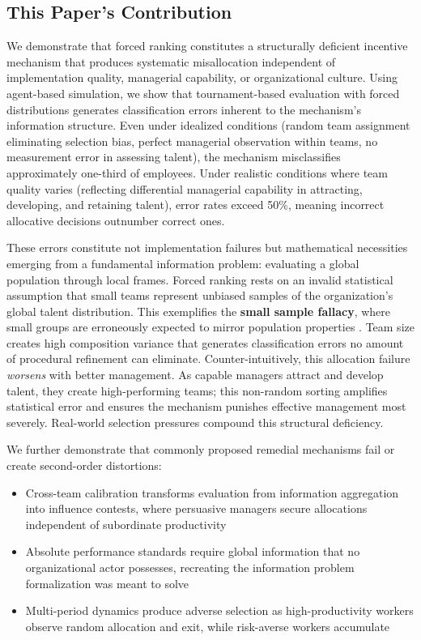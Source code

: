 \documentclass[12pt]{article}
\begin{document}
\subsection{This Paper's Contribution}

We demonstrate that forced ranking constitutes a structurally deficient incentive mechanism that produces systematic misallocation independent of implementation quality, managerial capability, or organizational culture. Using agent-based simulation, we show that tournament-based evaluation with forced distributions generates classification errors inherent to the mechanism's information structure. Even under idealized conditions (random team assignment eliminating selection bias, perfect managerial observation within teams, no measurement error in assessing talent), the mechanism misclassifies approximately one-third of employees. Under realistic conditions where team quality varies (reflecting differential managerial capability in attracting, developing, and retaining talent), error rates exceed 50\%, meaning incorrect allocative decisions outnumber correct ones.

These errors constitute not implementation failures but mathematical necessities emerging from a fundamental information problem: evaluating a global population through local frames. Forced ranking rests on an invalid statistical assumption that small teams represent unbiased samples of the organization's global talent distribution. This exemplifies the \textbf{small sample fallacy}, where small groups are erroneously expected to mirror population properties \citep{tversky1971law}. Team size creates high composition variance that generates classification errors no amount of procedural refinement can eliminate. Counter-intuitively, this allocation failure \textit{worsens} with better management. As capable managers attract and develop talent, they create high-performing teams; this non-random sorting amplifies statistical error and ensures the mechanism punishes effective management most severely. Real-world selection pressures compound this structural deficiency.

We further demonstrate that commonly proposed remedial mechanisms fail or create second-order distortions:

\begin{itemize}
\item Cross-team calibration transforms evaluation from information aggregation into influence contests, where persuasive managers secure allocations independent of subordinate productivity
\item Absolute performance standards require global information that no organizational actor possesses, recreating the information problem formalization was meant to solve
\item Multi-period dynamics produce adverse selection as high-productivity workers observe random allocation and exit, while risk-averse workers accumulate
\end{itemize}
\end{document}
